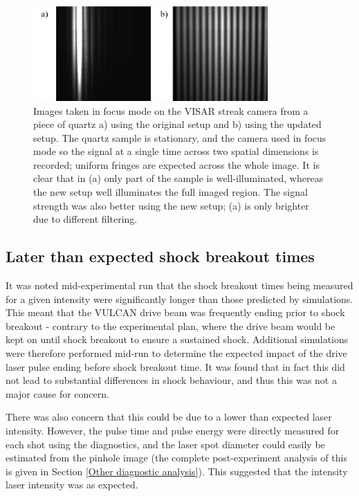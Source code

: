\begin{figure}
\begin{centering}
\includegraphics[width=0.8\textwidth]{figures/Experiment/VISAR before and after.png}%
\caption{\label{fig:VISAR before and after} Images taken in focus mode on the VISAR streak camera from a piece of quartz a) using the original setup and b) using the updated setup. The quartz sample is stationary, and the camera used in focus mode so the signal at a single time across two spatial dimensions is recorded; uniform fringes are expected across the whole image. It is clear that in (a) only part of the sample is well-illuminated, whereas the new setup well illuminates the full imaged region. The signal strength was also better using the new setup; (a) is only brighter due to different filtering.}
\end{centering}
\end{figure}

\subsection{Later than expected shock breakout times}

It was noted mid-experimental run that the shock breakout times being measured for a given intensity were significantly longer than those predicted by simulations. This meant that the VULCAN drive beam was frequently ending prior to shock breakout - contrary to the experimental plan, where the drive beam would be kept on until shock breakout to ensure a sustained shock. Additional simulations were therefore performed mid-run to determine the expected impact of the drive laser pulse ending before shock breakout time. It was found that in fact this did not lead to substantial differences in shock behaviour, and thus this was not a major cause for concern.

There was also concern that this could be due to a lower than expected laser intensity. However, the pulse time and pulse energy were directly measured for each shot using the diagnostics, and the laser spot diameter could easily be estimated from the pinhole image (the complete post-experiment analysis of this is given in Section \ref{Other diagnostic analysis}). This suggested that the intensity laser intensity was as expected.

